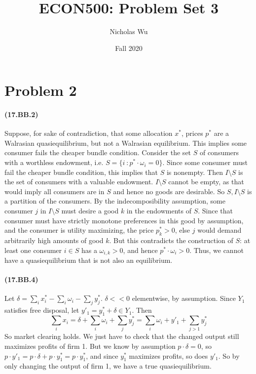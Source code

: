 \documentclass[10pt,letter]{article}
\begin{document}


\title{ECON500: Problem Set 3}

\author{Nicholas Wu}

\date{Fall 2020}

\maketitle


\section*{Problem 2}
\paragraph{(17.BB.2)}
Suppose, for sake of contradiction, that some allocation $x^*$, prices $p^*$ are a Walrasian quasiequilibrium, but not a Walrasian equilibrium. This implies some consumer fails the cheaper bundle condition. Consider the set $S$ of consumers with a worthless endowment, i.e. $S = \{ i \ : p^* \cdot \omega_i = 0 \} $. Since some consumer must fail the cheaper bundle condition, this implies that $S$ is nonempty. Then $I \setminus S$ is the set of consumers with a valuable endowment. $I \setminus S$ cannot be empty, as that would imply all consumers are in $S$ and hence no goods are desirable. So $S, I\setminus S$ is a partition of the consumers. By the indecomposibility assumption, some consumer $j$ in $I \setminus S$ must desire a good $k$ in the endowments of $S$. Since that consumer must have strictly monotone preferences in this good by assumption, and the consumer is utility maximizing, the price $p^*_k > 0$, else $j$ would demand arbitrarily high amounts of good $k$.
But this contradicts the construction of $S$: at least one consumer $i \in S$ has a $\omega_{i, k} > 0$, and hence $p^* \cdot \omega_i > 0$. Thus, we cannot have a quasiequilibrium that is not also an equilibrium.
\paragraph{(17.BB.4)}
Let $\delta = \sum_i x^*_i - \sum_i \omega_i - \sum_j y^*_j$. $\delta << 0$ elementwise, by assumption. Since $Y_1$ satisfies free disposal, let $y'_1 = y^*_1 + \delta \in Y_1$. Then
\[ \sum_i x_i = \delta + \sum_i \omega_i + \sum_j y^*_j = \sum_i \omega_i + y'_1 + \sum_{j > 1} y^*_j \]
So market clearing holds. We just have to check that the changed output still maximizes profits of firm 1. But we know by assumption $p \cdot \delta = 0$, so $p \cdot y'_1 = p \cdot \delta + p \cdot y^*_1 = p \cdot y^*_1$, and since $y^*_1$ maximizes profits, so does $y'_1$. So by only changing the output of firm 1, we have a true quasiequilibrium.
\end{document}
